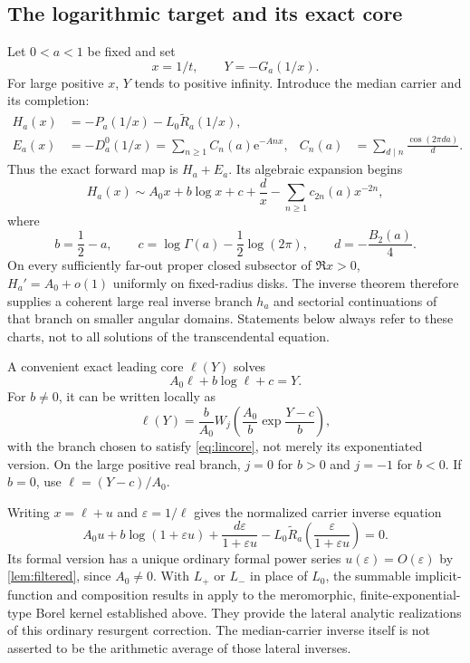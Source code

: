\documentclass[11pt,a4paper]{article}
\numberwithin{equation}{section}
\theoremstyle{definition}
\theoremstyle{remark}
\newcommand{\e}{\mathrm e}
\newcommand{\eps}{\varepsilon}
\newcommand{\wt}{\widetilde}
\begin{document}
\subsection{The logarithmic target and its exact core}
Let $0<a<1$ be fixed and set
\begin{equation}
 x=1/t,\qquad Y=-G_a(1/x).
 \label{eq:target}
\end{equation}
For large positive $x$, $Y$ tends to positive infinity. Introduce the
median carrier and its completion:
\begin{align}
 H_a(x)&=-P_a(1/x)-L_0\wt R_a(1/x),\label{eq:H}\\
 E_a(x)&=-D_a^0(1/x)=\sum_{n\geq1}C_n(a)\e^{-Anx},
 &C_n(a)&=\sum_{d\mid n}\frac{\cos(2\pi da)}d.
 \label{eq:Ecusp}
\end{align}
Thus the exact forward map is $H_a+E_a$. Its algebraic expansion begins
\begin{equation}
 H_a(x)\sim A_0x+b\log x+c+\frac d{x}
                       -\sum_{n\geq1}c_{2n}(a)x^{-2n},
 \label{eq:Hasy}
\end{equation}
where
\begin{equation}
 b=\frac12-a,\qquad
 c=\log\Gamma(a)-\frac12\log(2\pi),\qquad d=-\frac{B_2(a)}4.
 \label{eq:bcd}
\end{equation}
On every sufficiently far-out proper closed subsector of $\Re x>0$,
$H_a'=A_0+o(1)$ uniformly on fixed-radius disks. The inverse theorem therefore supplies a coherent
large real inverse branch $h_a$ and sectorial continuations of that
branch on smaller angular domains. Statements below always refer to
these charts, not to all solutions of the transcendental equation.

A convenient exact leading core $\ell(Y)$ solves
\begin{equation}
 A_0\ell+b\log\ell+c=Y.
 \label{eq:lincore}
\end{equation}
For $b\ne0$, it can be written locally as
\begin{equation}
 \ell(Y)=\frac b{A_0}
 W_j\!\left(\frac{A_0}{b}\exp\frac{Y-c}{b}\right),
 \label{eq:Lambert}
\end{equation}
with the branch chosen to satisfy \eqref{eq:lincore}, not merely its
exponentiated version. On the large positive real branch, $j=0$ for
$b>0$ and $j=-1$ for $b<0$. If $b=0$, use $\ell=(Y-c)/A_0$.

Writing $x=\ell+u$ and $\eps=1/\ell$ gives the normalized carrier
inverse equation
\begin{equation}
 A_0u+b\log(1+\eps u)+\frac{d\eps}{1+\eps u}
 -L_0\wt R_a\!\left(\frac{\eps}{1+\eps u}\right)=0.
 \label{eq:exactcorenormalization}
\end{equation}
Its formal version has a unique ordinary formal power series
$u(\eps)=O(\eps)$ by \cref{lem:filtered}, since $A_0\ne0$.
With $L_+$ or $L_-$ in place of $L_0$, the summable implicit-function
and composition results in \cite{sauzin} apply to the meromorphic,
finite-exponential-type Borel kernel established above. They provide
the lateral analytic realizations of this ordinary resurgent
correction. The median-carrier inverse itself is not asserted to be
the arithmetic average of those lateral inverses.
\end{document}
